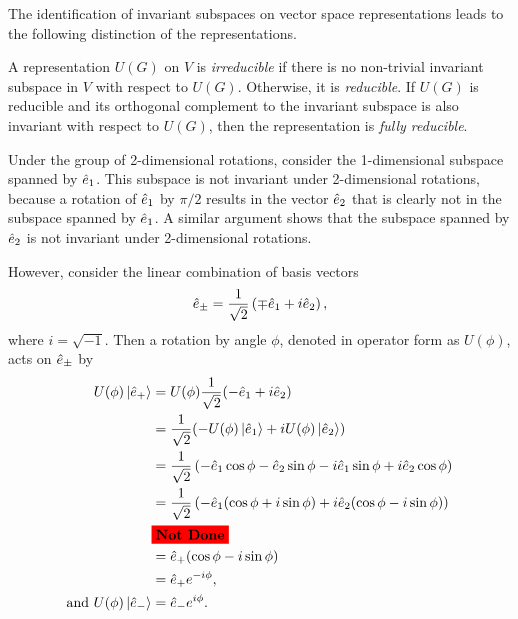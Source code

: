 The identification of invariant subspaces on vector space representations leads to the following distinction of the representations.
\begin{definition}
    A representation $U(G)$ on $V$ is \textit{irreducible} if there is no non-trivial invariant subspace in $V$ with respect to $U(G)$. Otherwise, it is \textit{reducible}. If $U(G)$ is reducible and its orthogonal complement to the invariant subspace is also invariant with respect to $U(G)$, then the representation is \textit{fully reducible}.
    
\end{definition}

\begin{example}
    Under the group of 2-dimensional rotations, consider the 1-dimensional subspace spanned by $\hat{e}_1$. This subspace is not invariant under 2-dimensional rotations, because a rotation of $\hat{e}_1$ by $\pi/2$ results in the vector $\hat{e}_2$ that is clearly not in the subspace spanned by $\hat{e}_1$. A similar argument shows that the subspace spanned by $\hat{e}_2$ is not invariant under 2-dimensional rotations.

    However, consider the linear combination of basis vectors
    \begin{equation}
        \hat{e}_\pm = \frac{1}{\sqrt{2}}\left( \mp\hat{e}_1 + i\hat{e}_2 \right),
    \end{equation}
    where $i = \sqrt{-1}$. Then a rotation by angle $\phi$, denoted in operator form as $U(\phi)$, acts on $\hat{e}_\pm$ by
    \begin{align}
        U(\phi)\ket{\ehat_+} &= U(\phi)\frac{1}{\sqrt{2}}(-\ehat_1 + i\ehat_2) \\
        &= \frac{1}{\sqrt{2}}(-U(\phi)\ket{\ehat_1} + iU(\phi)\ket{\ehat_2}) \nonumber \\
        &= \frac{1}{\sqrt{2}}\left( -\ehat_1\cos\phi - \ehat_2\sin\phi -i\ehat_1\sin\phi + i\ehat_2\cos\phi \right) \nonumber \\
        &= \frac{1}{\sqrt{2}}\left( -\ehat_1(\cos\phi+ i\sin\phi) +i\ehat_2(\cos\phi-i\sin\phi) \right) \nonumber \\
        & \colorbox{red}{\textbf{Not Done}} \nonumber \\
        &= \ehat_+ (\cos\phi - i\sin\phi) \nonumber \\
        &= \ehat_+ e^{-i\phi}, \\
        \textrm{and } U(\phi)\ket{\ehat_-} &= \ehat_- e^{i\phi}.
    \end{align}

\end{example}



